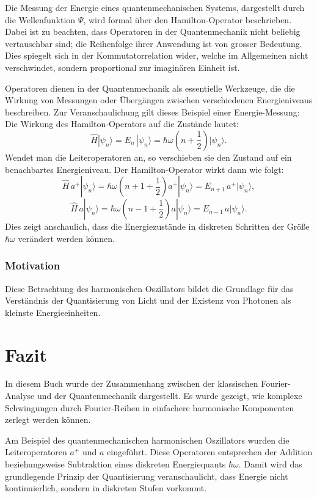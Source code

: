 			Die Messung der Energie eines quantenmechanischen Systems, dargestellt durch die Wellenfunktion \(\Psi\), wird formal über den Hamilton-Operator beschrieben.
			Dabei ist zu beachten, dass Operatoren in der Quantenmechanik nicht beliebig vertauschbar sind; die Reihenfolge ihrer Anwendung ist von grosser Bedeutung.
			Dies spiegelt sich in der Kommutatorrelation wider, welche im Allgemeinen nicht verschwindet, sondern proportional zur imaginären Einheit ist.

			Operatoren dienen in der Quantenmechanik als essentielle Werkzeuge, die die Wirkung von Messungen oder Übergängen zwischen verschiedenen Energieniveaus beschreiben.
			Zur Veranschaulichung gilt dieses Beispiel einer Energie-Messung:
			Die Wirkung des Hamilton-Operators auf die Zustände lautet:
			\[
				\hat{H} |\psi_n\rangle = E_n\, |\psi_n\rangle = \hbar\omega\left(n + \frac{1}{2}\right) |\psi_n\rangle.
			\]
			Wendet man die Leiteroperatoren an, so verschieben sie den Zustand auf ein benachbartes Energieniveau.
			Der Hamilton-Operator wirkt dann wie folgt:
			\[
				\hat{H}\, a^+ |\psi_n\rangle = \hbar\omega\left(n + 1 + \frac{1}{2}\right) a^+|\psi_n\rangle = E_{n+1}\, a^+|\psi_n\rangle,
			\]
			\[
				\hat{H}\, a |\psi_n\rangle = \hbar\omega\left(n - 1 + \frac{1}{2}\right) a|\psi_n\rangle = E_{n-1}\, a|\psi_n\rangle.
			\]
			Dies zeigt anschaulich, dass die Energiezustände in diskreten Schritten der Größe \(\hbar\omega\) verändert werden können.

		\subsubsection{Motivation}
			Diese Betrachtung des harmonischen Oszillators bildet die Grundlage für das Verständnis der Quantisierung von Licht und der Existenz von Photonen als kleinste Energieeinheiten.

\section{Fazit\label{fourier:section:fazit}}
	In diesem Buch wurde der Zusammenhang zwischen der klassischen Fourier-Analyse und der Quantenmechanik dargestellt.
	Es wurde gezeigt, wie komplexe Schwingungen durch Fourier-Reihen in einfachere harmonische Komponenten zerlegt werden können.

	Am Beispiel des quantenmechanischen harmonischen Oszillators wurden die Leiteroperatoren $a^+$ und $a$ eingeführt.
	Diese Operatoren entsprechen der Addition beziehungsweise Subtraktion eines diskreten Energiequants $\hbar \omega$.
	Damit wird das grundlegende Prinzip der Quantisierung veranschaulicht, dass Energie nicht kontinuierlich, sondern in diskreten Stufen vorkommt.

